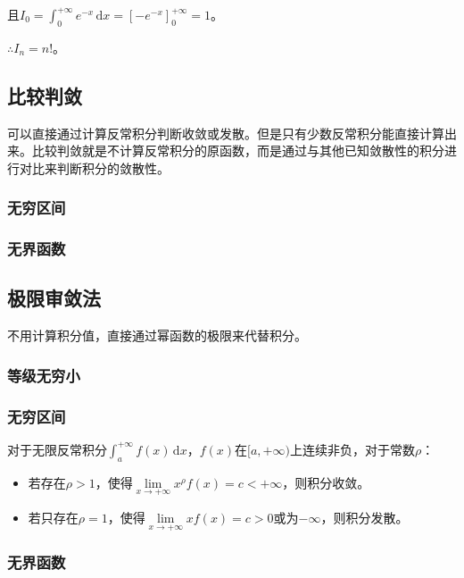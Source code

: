 \documentclass[UTF8, 12pt]{ctexart}
\begin{document}
且$I_0=\int_0^{+\infty}e^{-x}\,\textrm{d}x=[-e^{-x}]_0^{+\infty}=1$。

$\therefore I_n=n!$。

\subsection{比较判敛}

可以直接通过计算反常积分判断收敛或发散。但是只有少数反常积分能直接计算出来。比较判敛就是不计算反常积分的原函数，而是通过与其他已知敛散性的积分进行对比来判断积分的敛散性。

\subsubsection{无穷区间}

\subsubsection{无界函数}

\subsection{极限审敛法}

不用计算积分值，直接通过幂函数的极限来代替积分。

\subsubsection{等级无穷小}

\subsubsection{无穷区间}

对于无限反常积分$\int_a^{+\infty}f(x)\,\textrm{d}x$，$f(x)$在$[a,+\infty)$上连续非负，对于常数$\rho$：

\begin{itemize}
    \item 若存在$\rho>1$，使得$\lim\limits_{x\to+\infty}x^\rho f(x)=c<+\infty$，则积分收敛。
    \item 若只存在$\rho=1$，使得$\lim\limits_{x\to+\infty}xf(x)=c>0$或为$-\infty$，则积分发散。
\end{itemize}

\subsubsection{无界函数}
\end{document}
